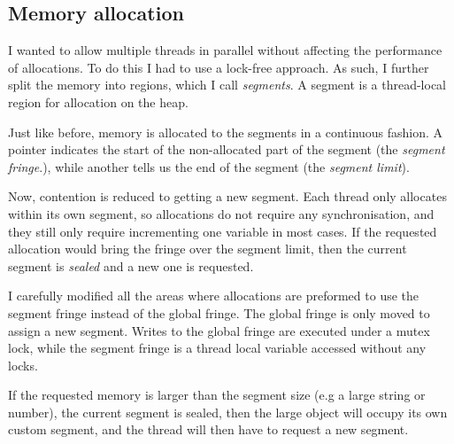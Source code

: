 


\subsection{Memory allocation}
\label{sec:malloc}
I wanted to allow multiple threads in parallel without affecting the performance
of allocations. To do this I had to use a lock-free approach. As such, I further
split the memory into regions, which I call \emph{segments}. A segment is a thread-local region
for allocation on the heap.

Just like before, memory is allocated to the segments in a continuous
fashion. A pointer indicates the start of the non-allocated part of the segment
(the \emph{segment fringe}.), while another tells us the end of the segment
(the \emph{segment limit}).

Now, contention is reduced to getting a new segment. Each thread only allocates within
its own segment, so allocations do not require any synchronisation, and they still only
require incrementing one variable in most cases. If the requested allocation would bring
the fringe over the segment limit, then the current segment is \emph{sealed} and a new one is
requested.

I carefully modified all the areas where allocations are preformed to use the segment fringe
instead of the global fringe. The global fringe is only moved to assign a new segment. Writes
to the global fringe are executed under a mutex lock, while the segment fringe is a thread local
variable accessed without any locks.

If the requested memory is larger than the segment size (e.g a large string or number),
the current segment is sealed, then the large object will occupy its own custom segment,
and the thread will then have to request a new segment.

